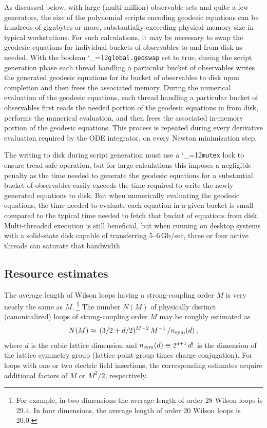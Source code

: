 \documentclass [12pt]{article}
\makeatletter
\renewcommand{\tt}{\begingroup\catcode`_=12\def\_{\string_}\tt@}
\newcommand{\tt@}[1]{\texttt{#1}\endgroup}
\makeatother
\begin{document}
As discussed below,
with large (multi-million) observable sets and quite a few
generators, the size of the polynomial scripts encoding
geodesic equations 
can be hundreds of gigabytes or more, substantially
exceeding physical memory size in typical workstations.
For such calculations, it may be necessary to swap
the geodesic equations for individual
buckets of observables to and from disk as needed.
With the boolean \tt{global.geoswap} set to true, 
during the script generation phase
each thread handling a particular bucket
of observables writes the generated geodesic equations
for its bucket of observables to disk upon completion
and then frees the associated memory.
During the numerical evaluation of the geodesic equations,
each thread handling a particular bucket of observables
first reads the needed portion of the geodesic equations
in from disk, performs the numerical evaluation,
and then frees the associated in-memory portion of the 
geodesic equations.
This process is repeated during every derivative
evaluation required by the ODE integrator, on every
Newton minimization step.

The writing to disk during script generation must use
a \tt{mutex} lock to ensure tread-safe operation, but
for large calculations
this imposes a negligible penalty as the time needed to
generate the geodesic equations for a substantial bucket of
observables easily exceeds the time required to write the newly 
generated equations to disk.
But when numerically evaluating the geodesic equations,
the time needed to evaluate each equation in a given
bucket is small compared to the typical time needed to
fetch that bucket of equations from disk.
Multi-threaded execution is still beneficial, but when
running on desktop systems with a solid-state disk capable of
transferring 5--6\,Gb/sec, three or four active threads can
saturate that bandwidth.

\subsection{Resource estimates}

The average length of Wilson loops having
a strong-coupling order $M$ is very nearly the same as $M$.%
\footnote
    {%
    For example, in two dimensions the average length of
    order 28 Wilson loops is 29.4.
    In four dimensions, the average length of order 20
    Wilson loops is 20.0.
    }
The number $N(M)$ of physically distinct (canonicalized) loops
of strong-coupling order $M$ may be roughly estimated
as
\begin{equation}
    N(M) \approx \, (3/2 + d/2)^{M-2} \, M^{-1} \, / n_{\rm sym}(d) \,,
\end{equation}
where $d$ is the cubic lattice dimension and
$
    n_{\rm sym}(d) \equiv 2^{d+1} \, d!
$
is the dimension of the lattice symmetry group
(lattice point group times charge conjugation).
For loops with one or two electric field insertions, the corresponding
estimates acquire additional factors of $M$ or $M^2/2$, respectively.
\end{document}

